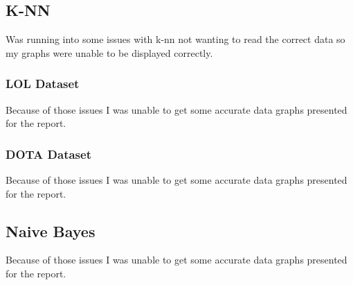\documentclass[a4paper,fleqn]{cas-sc}
\begin{document}
\subsection{K-NN}
Was running into some issues with k-nn not wanting to read the correct data so my graphs were unable to be displayed
 correctly.
 \\
\subsubsection{LOL Dataset}
Because of those issues I was unable to get some accurate data graphs presented for the report.
 \\
\subsubsection{DOTA Dataset}
Because of those issues I was unable to get some accurate data graphs presented for the report.
 \\
\subsection{Naive Bayes}
Because of those issues I was unable to get some accurate data graphs presented for the report.
 \\
\end{document}
